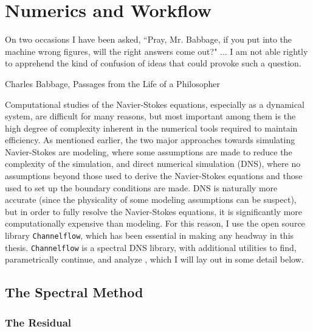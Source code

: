 \chapter{Numerics and Workflow}

    	 	\epigraph{On two occasions I have been asked, ``Pray, Mr. Babbage, if you put into the machine wrong figures, will the right answers come out?" ... I am not able rightly to apprehend the kind of confusion of ideas that could provoke such a question.}{Charles Babbage, Passages from the Life of a Philosopher}

Computational studies of the Navier-Stokes equations, especially as a dynamical system, are difficult for many reasons, but most important among them is the high degree of complexity inherent in the numerical tools required to maintain efficiency. As mentioned earlier, the two major approaches towards simulating Navier-Stokes are modeling, where some assumptions are made to reduce the complexity of the simulation, and direct numerical simulation (DNS), where no assumptions beyond those used to derive the Navier-Stokes equations and those  used to set up the boundary conditions are made. DNS is naturally more accurate (since the physicality of some modeling assumptions can be suspect), but in order to fully resolve the Navier-Stokes equations, it is significantly more computationally expensive than modeling. For this reason, I use the open source library {\tt Channelflow}, which has been essential in making any headway in this thesis. {\tt Channelflow} is a spectral DNS library, with additional utilities to find, parametrically continue, and analyze \ecs, which I will lay out in some detail below.
\section{The Spectral Method}
\subsection{The Residual}

